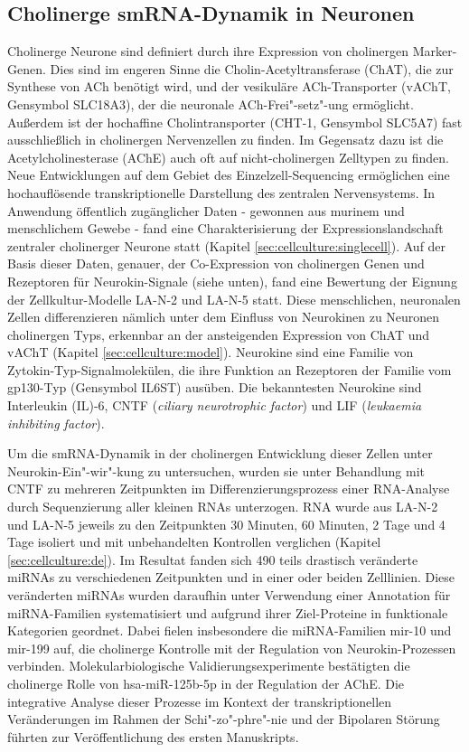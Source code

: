 \subsection{Cholinerge smRNA-Dynamik in Neuronen}
Cholinerge Neurone sind definiert durch ihre Expression von cholinergen Marker-Genen. Dies sind im engeren Sinne die Cholin-Acetyltransferase (ChAT), die zur Synthese von ACh benötigt wird, und der vesikuläre ACh-Transporter (vAChT, Gensymbol SLC18A3), der die neuronale ACh-Frei"-setz"-ung ermöglicht. Außerdem ist der hochaffine Cholintransporter (CHT-1, Gensymbol SLC5A7) fast ausschließlich in cholinergen Nervenzellen zu finden. Im Gegensatz dazu ist die Acetylcholinesterase (AChE) auch oft auf nicht-cholinergen Zelltypen zu finden. Neue Entwicklungen auf dem Gebiet des Einzelzell-Sequencing ermöglichen eine hochauflösende transkriptionelle Darstellung des zentralen Nervensystems. In Anwendung öffentlich zugänglicher Daten - gewonnen aus murinem und menschlichem Gewebe - fand eine Charakterisierung der Expressionslandschaft zentraler cholinerger Neurone statt (Kapitel \ref{sec:cellculture:singlecell}). Auf der Basis dieser Daten, genauer, der Co-Expression von cholinergen Genen und Rezeptoren für Neurokin-Signale (siehe unten), fand eine Bewertung der Eignung der Zellkultur-Modelle LA-N-2 und LA-N-5 statt. Diese menschlichen, neuronalen Zellen differenzieren nämlich unter dem Einfluss von Neurokinen zu Neuronen cholinergen Typs, erkennbar an der ansteigenden Expression von ChAT und vAChT (Kapitel \ref{sec:cellculture:model}). Neurokine sind eine Familie von Zytokin-Typ-Signalmolekülen, die ihre Funktion an Rezeptoren der Familie vom gp130-Typ (Gensymbol IL6ST) ausüben. Die bekanntesten Neurokine sind Interleukin (IL)-6, CNTF (\emph{ciliary neurotrophic factor}) und LIF (\emph{leukaemia inhibiting factor}).

Um die smRNA-Dynamik in der cholinergen Entwicklung dieser Zellen unter Neurokin-Ein"-wir"-kung zu untersuchen, wurden sie unter Behandlung mit CNTF zu mehreren Zeitpunkten im Differenzierungsprozess einer RNA-Analyse durch Sequenzierung aller kleinen RNAs unterzogen. RNA wurde aus LA-N-2 und LA-N-5 jeweils zu den Zeitpunkten 30 Minuten, 60 Minuten, 2 Tage und 4 Tage isoliert und mit unbehandelten Kontrollen verglichen (Kapitel \ref{sec:cellculture:de}). Im Resultat fanden sich 490 teils drastisch veränderte miRNAs zu verschiedenen Zeitpunkten und in einer oder beiden Zelllinien. Diese veränderten miRNAs wurden daraufhin unter Verwendung einer Annotation für miRNA-Familien systematisiert und aufgrund ihrer Ziel-Proteine in funktionale Kategorien geordnet. Dabei fielen insbesondere die miRNA-Familien mir-10 und mir-199 auf, die cholinerge Kontrolle mit der Regulation von Neurokin-Prozessen verbinden. Molekularbiologische Validierungsexperimente bestätigten die cholinerge Rolle von hsa-miR-125b-5p in der Regulation der AChE. Die integrative Analyse dieser Prozesse im Kontext der transkriptionellen Veränderungen im Rahmen der Schi"-zo"-phre"-nie und der Bipolaren Störung führten zur Veröffentlichung des ersten Manuskripts.\cite{Lobentanzer2019a}

